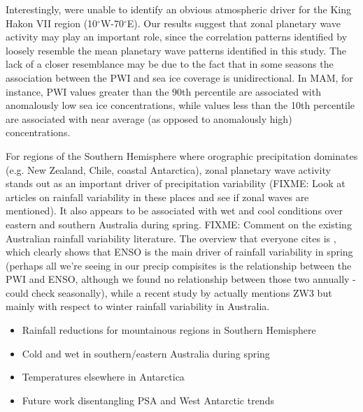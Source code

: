 Interestingly, \citet{Raphael2014} were unable to identify an obvious atmospheric driver for the King Hakon VII region (10$^{\circ}$W-70$^{\circ}$E). Our results suggest that zonal planetary wave activity may play an important role, since the correlation patterns identified by \citet{Raphael2014} loosely resemble the mean planetary wave patterns identified in this study. The lack of a closer resemblance may be due to the fact that in some seasons the association between the PWI and sea ice coverage is unidirectional. In MAM, for instance, PWI values greater than the 90th percentile are associated with anomalously low sea ice concentrations, while values less than the 10th percentile are associated with near average (as opposed to anomalously high) concentrations.

For regions of the Southern Hemisphere where orographic precipitation dominates (e.g. New Zealand, Chile, coastal Antarctica), zonal planetary wave activity stands out as an important driver of precipitation variability (FIXME: Look at articles on rainfall variability in these places and see if zonal waves are mentioned). It also appears to be associated with wet and cool conditions over eastern and southern Australia during spring. FIXME: Comment on the existing Australian rainfall variability literature. The overview that everyone cites is \citet{Risbey2009}, which clearly shows that ENSO is the main driver of rainfall variability in spring (perhaps all we're seeing in our precip compisites is the relationship between the PWI and ENSO, although we found no relationship between those two annually - could check seasonally), while a recent study by \citet{Frederiksen2014} actually mentions ZW3 but mainly with respect to winter rainfall variability in Australia.



\begin{itemize}
\item Rainfall reductions for mountainous regions in Southern Hemisphere
\item Cold and wet in southern/eastern Australia during spring
\item Temperatures elsewhere in Antarctica
\item Future work disentangling PSA and West Antarctic trends
\end{itemize}
